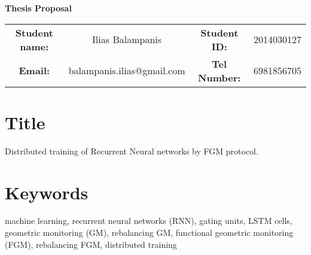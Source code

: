 \documentclass{article}
\begin{document}
    \begin{center}
        \LARGE{\textbf{Thesis Proposal}}\\[.5cm]

        \begin{table}[h!]

            \begin{tabular}{ c c c c }
                \hspace{-1.3cm}
                \textbf{Student name:} & Ilias Balampanis & \textbf{Student ID:} & 2014030127  \\
                \hspace{-1.5cm}
                \textbf{Email:} & balampanis.ilias@gmail.com &  \textbf{Tel Number:} & 6981856705 \\
            \end{tabular}
        \end{table}

    \end{center}


    \section*{Title}
    Distributed training of Recurrent Neural networks by FGM protocol.

    \section*{Keywords}
    machine learning, recurrent neural networks (RNN), gating units, LSTM cells, geometric monitoring (GM), rebalancing GM, functional geometric monitoring (FGM), rebalancing FGM, distributed training

\end{document}
